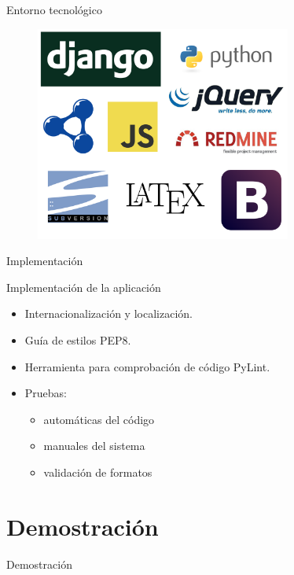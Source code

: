 \documentclass[spanish,xcolor=table,svgnames]{beamer}
\begin{document}
\begin{frame}{Entorno tecnológico}
  \begin{figure}[H]
    \begin{center}
        \includegraphics[width=0.75\textwidth]{img/logos_combinados.png}
    \end{center}
    \label{fig:tecnologias}
  \end{figure}
\end{frame}

\begin{frame}{Implementación}
  \begin{block}{Implementación de la aplicación}
    \begin{itemize}
      \item Internacionalización y localización.
      \item Guía de estilos PEP8.
      \item Herramienta para comprobación de código PyLint.
      \item Pruebas:
      \begin{itemize}
        \item automáticas del código
        \item manuales del sistema
        \item validación de formatos
      \end{itemize}
  \end{itemize}
  \end{block}
\end{frame}

\section{Demostración}
\begin{frame}{Demostración}
  \tableofcontents[currentsection]
\end{frame}
\end{document}
